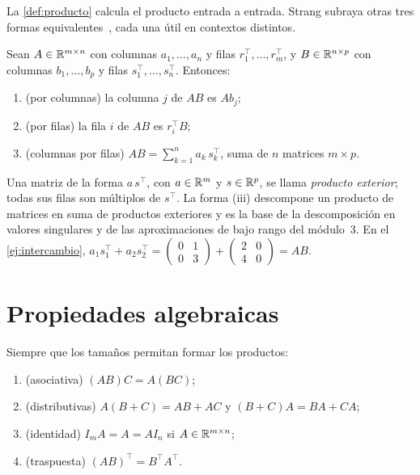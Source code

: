 La \cref{def:producto} calcula el producto entrada a entrada. Strang subraya otras tres formas equivalentes~\cite[§2.4]{strang}, cada una útil en contextos distintos.

\begin{proposicion}\label{prop:cuatro}
Sean $A\in\mathbb{R}^{m\times n}$ con columnas $a_1,\dots,a_n$ y filas $r_1^{\top},\dots,r_m^{\top}$, y $B\in\mathbb{R}^{n\times p}$ con columnas $b_1,\dots,b_p$ y filas $s_1^{\top},\dots,s_n^{\top}$. Entonces:
\begin{enumerate}
  \item (por columnas) la columna $j$ de $AB$ es $Ab_j$;
  \item (por filas) la fila $i$ de $AB$ es $r_i^{\top}B$;
  \item (columnas por filas) $AB=\sum_{k=1}^{n}a_k\,s_k^{\top}$, suma de $n$ matrices $m\times p$.
\end{enumerate}
\end{proposicion}

Una matriz de la forma $a\,s^{\top}$, con $a\in\mathbb{R}^{m}$ y $s\in\mathbb{R}^{p}$, se llama \emph{producto exterior}; todas sus filas son múltiplos de $s^{\top}$. La forma (iii) descompone un producto de matrices en suma de productos exteriores y es la base de la descomposición en valores singulares y de las aproximaciones de bajo rango del módulo~3. En el \cref{ej:intercambio}, $a_1s_1^{\top}+a_2s_2^{\top}=\begin{pmatrix}0&1\\0&3\end{pmatrix}+\begin{pmatrix}2&0\\4&0\end{pmatrix}=AB$.

\section{Propiedades algebraicas}

\begin{proposicion}\label{prop:algebra}
Siempre que los tamaños permitan formar los productos:
\begin{enumerate}
  \item (asociativa) $(AB)C=A(BC)$;
  \item (distributivas) $A(B+C)=AB+AC$ y $(B+C)A=BA+CA$;
  \item (identidad) $I_mA=A=AI_n$ si $A\in\mathbb{R}^{m\times n}$;
  \item (traspuesta) $(AB)^{\top}=B^{\top}A^{\top}$.
\end{enumerate}
\end{proposicion}

